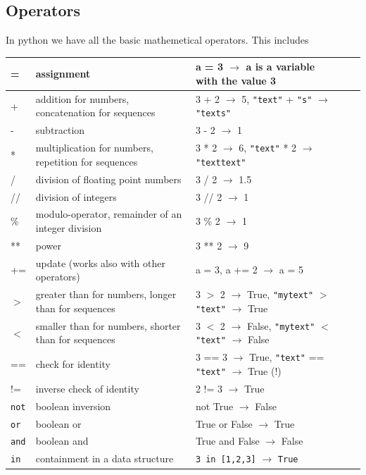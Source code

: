 \documentclass[10pt,a4paper]{article}
\newcommand{\te}{\texttt}
\begin{document}
\subsection{Operators}
In python we have all the basic mathemetical operators. This includes
\begin{table}[h]
\begin{tabular}{|l|l|l|l|l|}
\hline
= & assignment & a = 3 $\rightarrow$ a is a variable with the value 3 \\ \hline
+ & addition for numbers, concatenation for sequences & 3 + 2 $\rightarrow$ 5, 
\texttt{"text"} + \texttt{"s"} $\rightarrow$ \texttt{"texts"}
\\ \hline
- & subtraction & 3 - 2 $\rightarrow$ 1 \\ \hline
* & multiplication for numbers, repetition for sequences & 3 * 2 $\rightarrow$ 6, \texttt{"text"} * 2 $\rightarrow$ \texttt{"texttext"} \\ \hline
/ & division of floating point numbers & 3 / 2 $\rightarrow$ 1.5 \\ \hline
// & division of integers & 3 // 2 $\rightarrow$ 1 \\ \hline
\% & modulo-operator, remainder of an integer division & 3 \% 2 $\rightarrow$ 1 \\ \hline
** & power & 3 ** 2 $\rightarrow$ 9 \\ \hline
+= & update (works also with other operators) & a = 3, a += 2 $\rightarrow$ a = 5 \\ \hline
$>$ & greater than for numbers, longer than for sequences & 3 $>$ 2 $\rightarrow$ True, \texttt{"mytext"} $>$ \texttt{"text"} $\rightarrow$ True \\ \hline
$<$ & smaller than for numbers, shorter than for sequences & 3 $<$ 2 $\rightarrow$ False, \texttt{"mytext"} $<$ \texttt{"text"} $\rightarrow$ False \\ \hline
== & check for identity & 3 == 3 $\rightarrow$ True, \texttt{"text"} == \texttt{"text"} $\rightarrow$ True (!)\\ \hline
!= & inverse check of identity & 2 != 3 $\rightarrow$ True \\ \hline
\texttt{not} & boolean inversion & not True $\rightarrow$ False \\ \hline
\te{or} & boolean or & True or False $\rightarrow$ True \\ \hline
\te{and} & boolean and & True and False $\rightarrow$ False \\ \hline
\te{in} & containment in a data structure & \te{3 in [1,2,3]} $\rightarrow$ \te{True} \\ \hline
\end{tabular}
\end{table}
\end{document}
